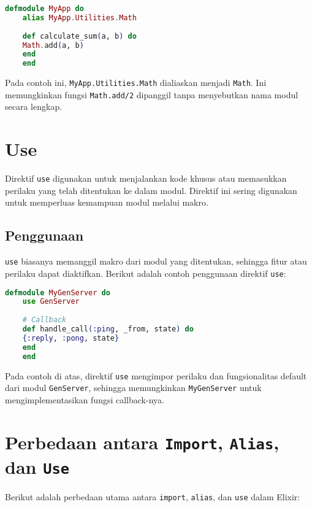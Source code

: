 \begin{lstlisting}[language=Elixir]
	defmodule MyApp do
	alias MyApp.Utilities.Math
	
	def calculate_sum(a, b) do
	Math.add(a, b)
	end
	end
\end{lstlisting}

Pada contoh ini, \texttt{MyApp.Utilities.Math} dialiaskan menjadi \texttt{Math}. Ini memungkinkan fungsi \texttt{Math.add/2} dipanggil tanpa menyebutkan nama modul secara lengkap.

\section{Use}
Direktif \texttt{use} digunakan untuk menjalankan kode khusus atau memasukkan perilaku yang telah ditentukan ke dalam modul. Direktif ini sering digunakan untuk memperluas kemampuan modul melalui makro.

\subsection{Penggunaan}
\texttt{use} biasanya memanggil makro dari modul yang ditentukan, sehingga fitur atau perilaku dapat diaktifkan. Berikut adalah contoh penggunaan direktif \texttt{use}:

\begin{lstlisting}[language=Elixir]
	defmodule MyGenServer do
	use GenServer
	
	# Callback
	def handle_call(:ping, _from, state) do
	{:reply, :pong, state}
	end
	end
\end{lstlisting}

Pada contoh di atas, direktif \texttt{use} mengimpor perilaku dan fungsionalitas default dari modul \texttt{GenServer}, sehingga memungkinkan \texttt{MyGenServer} untuk mengimplementasikan fungsi callback-nya.

\section{Perbedaan antara \texttt{Import}, \texttt{Alias}, dan \texttt{Use}}
Berikut adalah perbedaan utama antara \texttt{import}, \texttt{alias}, dan \texttt{use} dalam Elixir:

